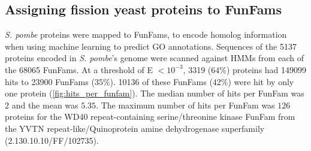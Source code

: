 %
%
%

\subsection{Assigning fission yeast proteins to FunFams}

\emph{S. pombe} proteins were mapped to FunFams, to encode homolog information when using machine learning to predict GO annotations. Sequences of the \num{5137} proteins encoded in \emph{S. pombe}'s genome were scanned against HMMs from each of the \num{68065} FunFams. At a threshold of E $< 10^{-3}$, \num{3319} ($64\%$) proteins had \num{149099} hits to \num{23900} FunFams ($35\%$).
\num{10136} of these FunFams ($42\%$) were hit by only one protein (\ref{fig:hits_per_funfam}). The median number of hits per FunFam was $2$ and the mean was $5.35$.
The maximum number of hits per FunFam was $126$ proteins for the WD40 repeat-containing serine/threonine kinase FunFam from the YVTN repeat-like/Quinoprotein amine dehydrogenase superfamily (2.130.10.10/FF/102735).

